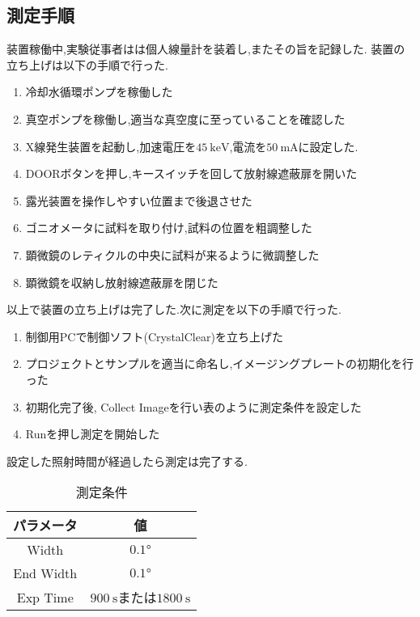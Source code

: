 \subsection{測定手順}
装置稼働中,実験従事者はは個人線量計を装着し,またその旨を記録した.
装置の立ち上げは以下の手順で行った.
\begin{enumerate}
  \item 冷却水循環ポンプを稼働した
  \item 真空ポンプを稼働し,適当な真空度に至っていることを確認した
  \item X線発生装置を起動し,加速電圧を$45\ \si{\keV}$,電流を$50\ \si{\milli\ampere}$に設定した.
  \item DOORボタンを押し,キースイッチを回して放射線遮蔽扉を開いた
  \item 露光装置を操作しやすい位置まで後退させた
  \item ゴニオメータに試料を取り付け,試料の位置を粗調整した
  \item 顕微鏡のレティクルの中央に試料が来るように微調整した
  \item 顕微鏡を収納し放射線遮蔽扉を閉じた
\end{enumerate}
以上で装置の立ち上げは完了した.次に測定を以下の手順で行った.
\begin{enumerate}
  \item 制御用PCで制御ソフト(CrystalClear)を立ち上げた
  \item プロジェクトとサンプルを適当に命名し,イメージングプレートの初期化を行った
  \item 初期化完了後, Collect Imageを行い表のように測定条件を設定した
  \item Runを押し測定を開始した
\end{enumerate}
設定した照射時間が経過したら測定は完了する.
\begin{table}[h]
  \caption{測定条件}
  \label{tab:sokuteicond}
  \centering
  \begin{tabular}{cc}
  \hline
  パラメータ&値\\
  \hline \hline
  Width&$0.1\si{\degree}$\\
  End Width&$0.1\si{\degree}$\\
  Exp Time&$900\ \si{\second}$または$1800\ \si{\second}$\\
  \hline
  \end{tabular}
\end{table}
